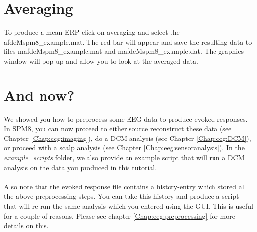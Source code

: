 \section{Averaging}
To produce a mean ERP click on averaging and select the afdeMspm8\_example.mat. The red bar will appear and save the resulting data to files mafdeMspm8\_example.mat and mafdeMspm8\_example.dat. The graphics window will pop up and allow you to look at the averaged data.


\section{And now?}
We showed you how to preprocess some EEG data to produce evoked responses. In SPM8, you can now proceed to either source reconstruct these data (see Chapter \ref{Chap:eeg:imaging}), do a DCM analysis (see Chapter \ref{Chap:eeg:DCM}), or proceed with a scalp analysis (see Chapter \ref{Chap:eeg:sensoranalysis}). In the \textit{example\_scripts} folder, we also provide an example script that will run a DCM analysis on the data you produced in this tutorial. 
\\
\\
Also note that the evoked response file contains a history-entry which stored all the above preprocessing steps. You can take this history and produce a script that will re-run the same analysis which you entered using the GUI. This is useful for a couple of reasons. Please see chapter \ref{Chap:eeg:preprocessing} for more details on this.